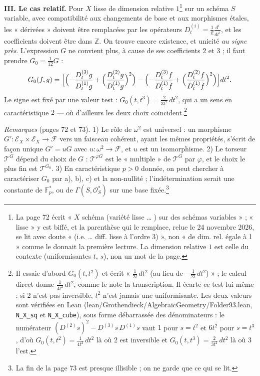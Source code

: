 \documentclass[11pt,a4paper]{article}
\begin{document}
\textbf{III. Le cas relatif.} Pour $X$ lisse de dimension relative $1$\footnote{La
page 72 écrit « $X$ schéma (variété lisse … ) sur des schémas variables » ;
« lisse » y est biffé, et la parenthèse qui le remplace, relue le 24 novembre
2026, se lit avec doute « (i.e. … diff. lisse à l'ordre 3) », non « de dim.
rel. égale à 1 » comme le donnait la première lecture. La dimension relative
$1$ est celle du contexte (uniformisantes $t$, $s$), non un mot de la page.} sur un
schéma $S$ variable, avec compatibilité aux changements de base et aux
morphismes étales, les « dérivées » doivent être remplacées par les
opérateurs $D^{(i)}_t = \frac{1}{i!}\frac{d^i}{dt^i}$, et les coefficients
doivent être dans $\mathbb{Z}$. On trouve encore existence, et unicité
\emph{au signe près}. L'expression $G$ ne convient plus, à cause de ses
coefficients $2$ et $3$ ; il faut prendre $G_0 = \frac{1}{12}G$ :
\[
  G_0(f,g) = \Bigl[\Bigl(-\frac{D^{(3)}_t g}{D^{(1)}_t g}
  + \Bigl(\frac{D^{(2)}_t g}{D^{(1)}_t g}\Bigr)^2\Bigr)
  - \Bigl(-\frac{D^{(3)}_t f}{D^{(1)}_t f}
  + \Bigl(\frac{D^{(2)}_t f}{D^{(1)}_t f}\Bigr)^2\Bigr)\Bigr] dt^2 .
\]
Le signe est fixé par une valeur test : $G_0(t, t^3) = \frac{2}{3t^2}\,dt^2$,
qui a un sens en caractéristique $2$ — où d'ailleurs les deux choix
coïncident.\footnote{Il essaie d'abord $G_0(t,t^2)$ et écrit
« $\frac{1}{2t}\,dt^2$ (au lieu de $-\frac{1}{2t}\,dt^2$) » ; le calcul direct
donne $\frac{1}{4t^2}\,dt^2$, comme le note la transcription. Il écarte ce test
lui-même : si $2$ n'est pas inversible, $t^2$ n'est jamais une
uniformisante. Les deux valeurs sont vérifiées en Lean
(lean/Grothendieck/AlgebraicGeometry/Folder93.lean, \texttt{N\_X\_sq} et \texttt{N\_X\_cube}),
sous forme débarrassée des dénominateurs : le numérateur
$(D^{(2)}s)^2 - D^{(3)}s\,D^{(1)}s$ vaut $1$ pour $s = t^2$ et $6t^2$ pour
$s = t^3$, d'où $G_0(t,t^2) = \frac{1}{4t^2}\,dt^2$ là où $2$ est inversible
et $G_0(t,t^3) = \frac{2}{3t^2}\,dt^2$ là où $3$ l'est.}

\emph{Remarques} (pages 72 et 73). 1) Le rôle de $\omega^2$ est universel : un
morphisme $G' : \mathcal{E}_X \times \mathcal{E}_X \to \mathcal{F}$ vers un faisceau
cohérent, ayant les mêmes propriétés, s'écrit de façon unique $G' = uG$ avec
$u : \omega^2 \to \mathcal{F}$, et $u$ est un isomorphisme. 2) Le torseur
$\mathcal{T}^G$ dépend du choix de $G$ : $\mathcal{T}^{\varphi G}$ est le
« multiple » de $\mathcal{T}^G$ par $\varphi$, et le choix le plus fin est
$\mathcal{T}^{G_0}$. 3) En caractéristique $p > 0$ donnée, on peut chercher à
caractériser $G_0$ par a), b), c) et la non-nullité ; l'indétermination
serait une constante de $\mathbb{F}_p^*$, ou de $\Gamma(S, \mathcal{O}_S^*)$ sur
une base fixée.\footnote{La fin de la page 73 est presque illisible ; on ne
garde que ce qui se lit.}
\end{document}

